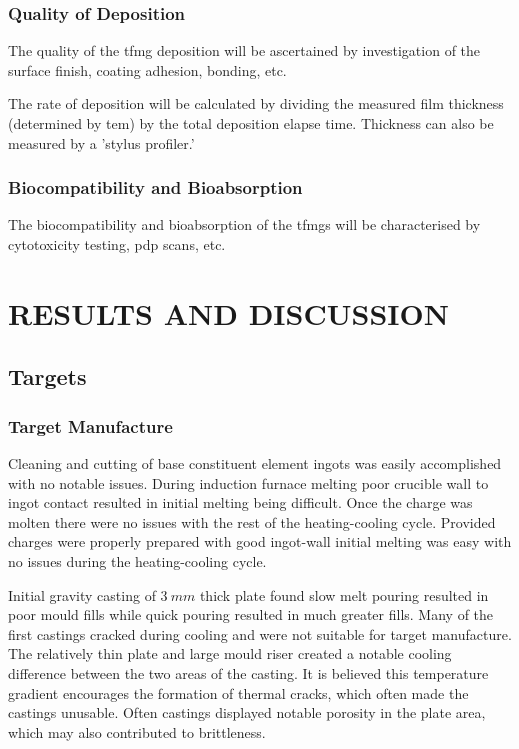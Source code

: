 \documentclass[a4paper,12pt,oneside]{report}%
\begin{document}
\subsection{Quality of Deposition} 
The quality of the \gls{tfmg} deposition will be ascertained by investigation of the surface finish, coating adhesion, bonding, etc.

The rate of deposition will be calculated by dividing the measured film thickness (determined by \acrshort{tem}) by the total deposition elapse time. Thickness can also be measured by a 'stylus profiler.'

\subsection{Biocompatibility and Bioabsorption} 
The biocompatibility and bioabsorption of the \glspl{tfmg} will be characterised by cytotoxicity testing, \acrshort{pdp} scans, etc. 


\chapter{RESULTS AND DISCUSSION}
\glsresetall

\section{Targets}
\subsection{Target Manufacture}
Cleaning and cutting of base constituent element ingots was easily accomplished with no notable issues. During induction furnace melting poor crucible wall to ingot contact resulted in initial melting being difficult. Once the charge was molten there were no issues with the rest of the heating-cooling cycle. Provided charges were properly prepared with good ingot-wall initial melting was easy with no issues during the heating-cooling cycle. 

Initial gravity casting of $3~ mm$ thick plate found slow melt pouring resulted in poor mould fills while quick pouring resulted in much greater fills. Many of the first castings cracked during cooling and were not suitable for target manufacture. The relatively thin plate and large mould riser created a notable cooling difference between the two areas of the casting. It is believed this temperature gradient encourages the formation of thermal cracks, which often made the castings unusable. Often castings displayed notable porosity in the plate area, which may also contributed to brittleness. 
\end{document}
